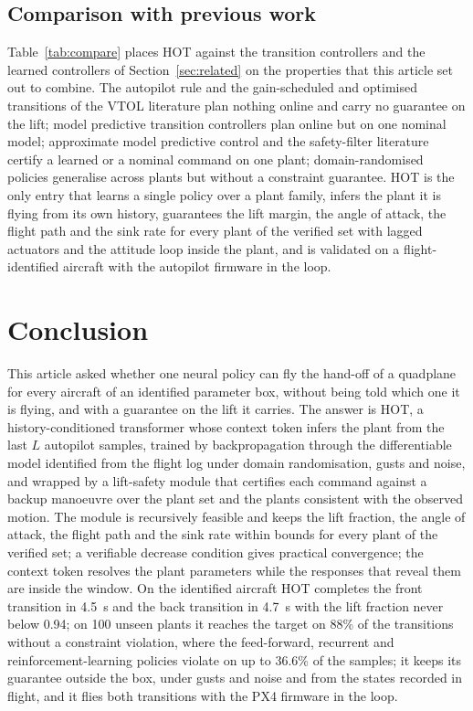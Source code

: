 \documentclass[final,5p,times,twocolumn]{elsarticle}
\newcommand{\hotBackT}{4.7}
\newcommand{\hotCrossReached}{88\%}
\newcommand{\hotFrontLf}{0.94}
\newcommand{\hotFrontT}{4.5}
\newcommand{\maxOtherCrossViol}{36.6}
\newcommand{\numCross}{100}
\begin{document}
\subsection{Comparison with previous work}\label{sec:compare}

Table~\ref{tab:compare} places HOT against the transition controllers and the learned controllers of Section~\ref{sec:related} on the properties that this article set out to combine. The autopilot rule and the gain-scheduled and optimised transitions of the VTOL literature plan nothing online and carry no guarantee on the lift; model predictive transition controllers plan online but on one nominal model; approximate model predictive control and the safety-filter literature certify a learned or a nominal command on one plant; domain-randomised policies generalise across plants but without a constraint guarantee. HOT is the only entry that learns a single policy over a plant family, infers the plant it is flying from its own history, guarantees the lift margin, the angle of attack, the flight path and the sink rate for every plant of the verified set with lagged actuators and the attitude loop inside the plant, and is validated on a flight-identified aircraft with the autopilot firmware in the loop.





\section{Conclusion}\label{sec:conclusion}
This article asked whether one neural policy can fly the hand-off of a quadplane for every aircraft of an identified parameter box, without being told which one it is flying, and with a guarantee on the lift it carries. The answer is HOT, a history-conditioned transformer whose context token infers the plant from the last $L$ autopilot samples, trained by backpropagation through the differentiable model identified from the flight log under domain randomisation, gusts and noise, and wrapped by a lift-safety module that certifies each command against a backup manoeuvre over the plant set and the plants consistent with the observed motion. The module is recursively feasible and keeps the lift fraction, the angle of attack, the flight path and the sink rate within bounds for every plant of the verified set; a verifiable decrease condition gives practical convergence; the context token resolves the plant parameters while the responses that reveal them are inside the window. On the identified aircraft HOT completes the front transition in \hotFrontT{}~s and the back transition in \hotBackT{}~s with the lift fraction never below \hotFrontLf{}; on \numCross{} unseen plants it reaches the target on \hotCrossReached{} of the transitions without a constraint violation, where the feed-forward, recurrent and reinforcement-learning policies violate on up to \maxOtherCrossViol{}\% of the samples; it keeps its guarantee outside the box, under gusts and noise and from the states recorded in flight, and it flies both transitions with the PX4 firmware in the loop.
\end{document}
